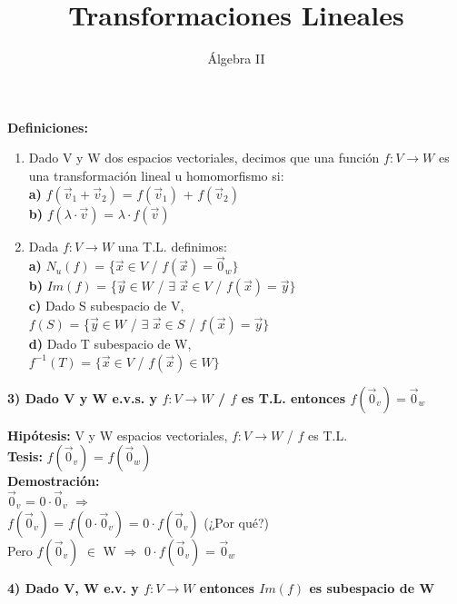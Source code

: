 \documentclass[11pt]{article}
\title{Transformaciones Lineales}
\author{Álgebra II}
\date{\vspace{-5ex}}
\begin{document}
\maketitle{}
{\Large \bfseries{Definiciones:}}
\begin{enumerate}
\item Dado V y W dos espacios vectoriales, decimos que una función $f: V \rightarrow W$ es una transformación lineal u homomorfismo si:\\
{\bfseries{a)}} $f(\vec{v}_1+\vec{v}_2)$ = $f(\vec{v}_1)$ + $f(\vec{v}_2)$\\
{\bfseries{b)}} $f(\lambda \cdot \vec{v})$ = $\lambda \cdot f(\vec{v})$
\item Dada $f: V \rightarrow W$ una T.L. definimos:\\
{\bfseries{a)}} $N_u(f)$ = \{$\vec{x} \in V$ / $f (\vec{x}) = \vec{0}_w\}$ \\
{\bfseries{b)}} $Im(f)$ = \{$\vec{y} \in W$ / $\exists$ $\vec{x} \in V$ / $f(\vec{x}) = \vec{y}\}$\\
{\bfseries{c)}} Dado S subespacio de V,\\
$f(S)$ = \{$\vec{y} \in W$ / $\exists$ $\vec{x} \in S$ / $f(\vec{x}) = \vec{y}\}$\\
{\bfseries{d)}} Dado T subespacio de W,\\
$f^{-1}(T)$ = $\{\vec{x} \in V$ / $f(\vec{x}) \in W\}$
\end{enumerate}
{\Large \bfseries{3) Dado V y W e.v.s. y $f: V \rightarrow W$ / $f$ es T.L. entonces $f(\vec{0}_v) = \vec{0}_w$}}

\vspace{2mm} \noindent
{\bfseries Hipótesis:} V y W espacios vectoriales, $f: V \rightarrow W$ / $f$ es T.L. \\
{\bfseries Tesis:} $f(\vec{0}_v)$ = $f(\vec{0}_w)$ \\
{\bfseries Demostración:} \\
$\vec{0}_v$ = $0 \cdot \vec{0}_v$ $\Rightarrow$\\
$f(\vec{0}_v)$ = $f(0\cdot \vec{0}_v)$ = $0 \cdot f(\vec{0}_v)$ (¿Por qué?) \\
Pero $f(\vec{0}_v)$ $\in$ W $\Rightarrow$ $0 \cdot f(\vec{0}_v)$ = $\vec{0}_w$

\vspace{2mm} \noindent
{\Large \bfseries{4) Dado V, W e.v. y $f: V \rightarrow W$ entonces $Im(f)$ es subespacio de W}}
\end{document}
